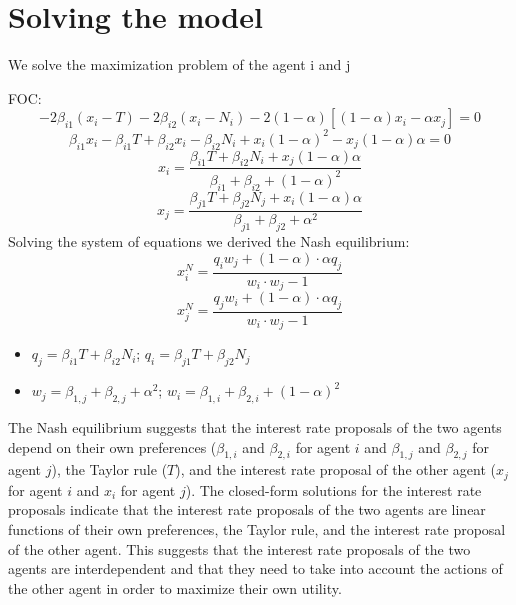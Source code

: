 \documentclass[12pt]{article}
\begin{document}
\section{Solving the model}
We solve the maximization problem of the agent i and j\par
FOC:
\[ -2\beta_{i1}(x_i-T)-2\beta_{i2}(x_i-N_i)-2(1 - \alpha) [(1 - \alpha) x_i - \alpha x_j]=0 \]
\[ \beta_{i1}x_i-\beta_{i1}T+\beta_{i2}x_i-\beta_{i2}N_i+ x_i (1 - \alpha)^2 - x_j (1 - \alpha)\alpha = 0 \]
\[ x_i = \frac{\beta_{i1} T + \beta_{i2}N_i + x_j (1 - \alpha)\alpha}{\beta_{i1} + \beta_{i2} + (1 - \alpha)^2}\]
\[ x_j = \frac{\beta_{j1} T+\beta_{j2}N_j+ x_i (1 - \alpha)\alpha}{\beta_{j1}+\beta_{j2}+\alpha^2}\]
Solving the system of equations we derived the Nash equilibrium:
\[x_i^N = \frac{ q_i w_j + (1 - \alpha)\cdot\alpha q_j} {w_i \cdot w_j - 1}\]
\[x_j^N = \frac{ q_j w_i + (1 - \alpha)\cdot\alpha q_j} {w_i \cdot w_j - 1}\]
\begin{itemize}
    \item \(q_j = \beta_{i1} T + \beta_{i2} N_i\); \(q_i = \beta_{j1} T + \beta_{j2} N_j\)
    \item \(w_j = \beta_{1,j} + \beta_{2,j} + \alpha^2\); \(w_i = \beta_{1,i} + \beta_{2,i} + (1 - \alpha)^2\)
\end{itemize}

The Nash equilibrium suggests that the interest rate proposals of the two agents depend on their own preferences
($\beta_{1,i}$ and $\beta_{2,i}$ for agent $i$ and $\beta_{1,j}$ and $\beta_{2,j}$ for agent $j$), the Taylor rule
($T$), and the interest rate proposal of the other agent ($x_j$ for agent $i$ and $x_i$ for agent $j$).
\vspace{8pt}
The closed-form solutions for the interest rate proposals indicate that the interest rate proposals of the two agents
are linear functions of their own preferences, the Taylor rule, and the interest rate proposal of the other agent. This
suggests that the interest rate proposals of the two agents are interdependent and that they need to take into account
the actions of the other agent in order to maximize their own utility.
\end{document}
